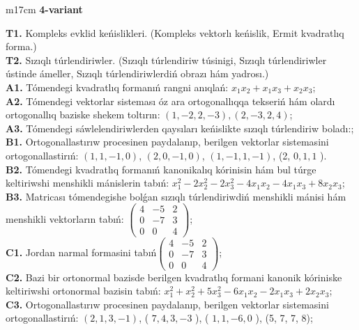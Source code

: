 \documentclass{article}
\begin{document}
\begin{tabular}{m{17cm}}
\textbf{4-variant}
\newline

\textbf{T1.} Kompleks evklid keńislikleri.  (Kompleks vektorlı keńislik, Ermit kvadratlıq forma.) \\
\textbf{T2.} Sızıqlı túrlendiriwler.  (Sızıqlı túrlendiriw túsinigi, Sızıqlı túrlendiriwler ústinde ámeller, Sızıqlı túrlendiriwlerdiń obrazı hám yadrosı.) \\
\textbf{A1.} Tómendegi kvadratlıq formanıń rangni anıqlań: \(x_{1}x_{2} + x_{1}x_{3} + x_{2}x_{3}\); \\
\textbf{A2.} Tómendegi vektorlar sisteması óz ara ortogonallıqqa tekseriń hám olardı ortogonallıq baziske shekem toltırın: \((1, - 2,2, - 3),(2, - 3,2,4)\); \\
\textbf{A3.} Tómendegi sáwlelendiriwlerden qaysıları keńislikte sızıqlı túrlendiriw boladı:; \\
\textbf{B1.} Ortogonallastırıw procesinen paydalanıp, berilgen vektorlar sistemasini ortogonallastirıń: \((1,1, - 1,0)\), \((2,0, - 1,0)\), \((1, - 1,1, - 1)\), (2, \(0,1,1\) ). \\
\textbf{B2.} Tómendegi kvadratlıq formanıń kanonikalıq kórinisin hám bul túrge keltiriwshi menshikli mánislerin tabıń: \(x_{1}^{2} - 2x_{2}^{2} - 2x_{3}^{2} - 4x_{1}x_{2} - 4x_{1}x_{3} + 8x_{2}x_{3}\); \\
\textbf{B3.} Matricası tómendegishe bolǵan sızıqlı túrlendiriwdiń menshikli mánisi hám menshikli vektorların tabıń: \(\begin{pmatrix} 4 & - 5 & 2 \\ 0 & - 7 & 3 \\ 0 & 0 & 4 \end{pmatrix}\); \\
\textbf{C1.} Jordan narmal formasini tabıń\(\begin{pmatrix} 4 & - 5 & 2 \\ 0 & - 7 & 3 \\ 0 & 0 & 4 \end{pmatrix}\); \\
\textbf{C2.} Bazi bir ortonormal bazisde berilgen kvadratlıq formani kanonik kóriniske keltiriwshi ortonormal bazisin tabıń: \(x_{1}^{2} + x_{2}^{2} + 5x_{3}^{2} - 6x_{1}x_{2} - 2x_{1}x_{3} + 2x_{2}x_{3}\); \\
\textbf{C3.} Ortogonallastırıw procesinen paydalanıp, berilgen vektorlar sistemasini ortogonallastirıń: \((2,1,3, - 1)\), ( \(7,4,3, - 3\) ), ( \(1,1, - 6,0\) ), (5, 7, 7, 8); \\

\end{tabular}
\vspace{1cm}
\end{document}

